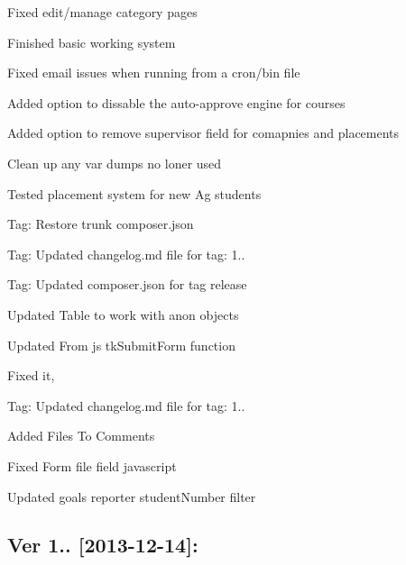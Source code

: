 \begin{DoxyItemize}
\item Fixed edit/manage category pages
\item Finished basic working system
\item Fixed email issues when running from a cron/bin file
\item Added option to dissable the auto-\/approve engine for courses
\item Added option to remove supervisor field for comapnies and placements
\item Clean up any var dumps no loner used
\item Tested placement system for new Ag students
\item Tag\+: Restore trunk composer.\+json
\item Tag\+: Updated changelog.\+md file for tag\+: 1..
\item Tag\+: Updated composer.\+json for tag release
\item Updated Table to work with anon objects
\item Updated From js tk\+Submit\+Form function
\item Fixed it,
\item Tag\+: Updated changelog.\+md file for tag\+: 1..
\item Added Files To Comments
\item Fixed Form file field javascript
\item Updated goals reporter student\+Number filter
\end{DoxyItemize}

\subsection*{Ver 1.. \mbox{[}2013-\/12-\/14\mbox{]}\+: }


